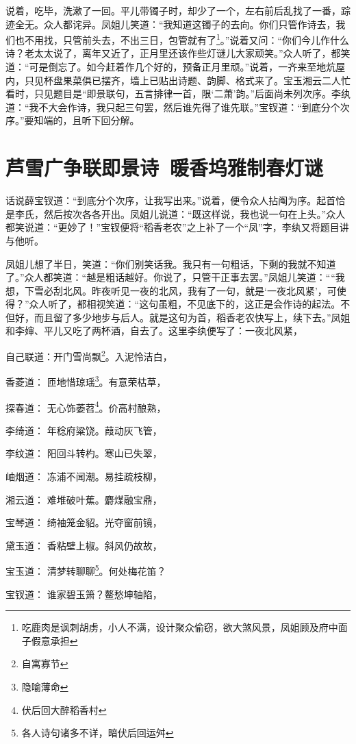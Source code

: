 \documentclass[12pt,oneside]{book}
\begin{document}
说着，吃毕，洗漱了一回。平儿带镯子时，却少了一个，左右前后乱找了一番，踪迹全无。众人都诧异。凤姐儿笑道：“我知道这镯子的去向。你们只管作诗去，我们也不用找，只管前头去，不出三日，包管就有了\footnote{吃鹿肉是讽刺胡虏，小人不满，设计聚众偷窃，欲大煞风景，凤姐顾及府中面子假意承担}。”说着又问：“你们今儿作什么诗？老太太说了，离年又近了，正月里还该作些灯谜儿大家顽笑。”众人听了，都笑道：“可是倒忘了。如今赶着作几个好的，预备正月里顽。”说着，一齐来至地炕屋内，只见杯盘果菜俱已摆齐，墙上已贴出诗题、韵脚、格式来了。宝玉湘云二人忙看时，只见题目是“即景联句，五言排律一首，限‘二萧’韵。”后面尚未列次序。李纨道：“我不大会作诗，我只起三句罢，然后谁先得了谁先联。”宝钗道：“到底分个次序。”要知端的，且听下回分解。


 
\chapter{芦雪广争联即景诗~暖香坞雅制春灯谜}
话说薛宝钗道：“到底分个次序，让我写出来。”说着，便令众人拈阄为序。起首恰是李氏，然后按次各各开出。凤姐儿说道：“既这样说，我也说一句在上头。”众人都笑说道：“更妙了！”宝钗便将“稻香老农”之上补了一个“凤”字，李纨又将题目讲与他听。

凤姐儿想了半日，笑道：“你们别笑话我。我只有一句粗话，下剩的我就不知道了。”众人都笑道：“越是粗话越好。你说了，只管干正事去罢。”凤姐儿笑道：““我想，下雪必刮北风。昨夜听见一夜的北风，我有了一句，就是‘一夜北风紧’，可使得？”众人听了，都相视笑道：“这句虽粗，不见底下的，这正是会作诗的起法。不但好，而且留了多少地步与后人。就是这句为首，稻香老农快写上，续下去。”凤姐和李婶、平儿又吃了两杯酒，自去了。这里李纨便写了：一夜北风紧，

自己联道：开门雪尚飘\footnote{自寓寡节}。入泥怜洁白，

香菱道：  匝地惜琼瑶\footnote{隐喻薄命}。有意荣枯草，

探春道：  无心饰萎苕\footnote{伏后回大醉稻香村}。价高村酿熟，

李绮道：  年稔府粱饶。葭动灰飞管，

李纹道：  阳回斗转杓。寒山已失翠，

岫烟道：  冻浦不闻潮。易挂疏枝柳，

湘云道：  难堆破叶蕉。麝煤融宝鼎，

宝琴道：  绮袖笼金貂。光夺窗前镜，

黛玉道：  香粘壁上椒。斜风仍故故，

宝玉道：  清梦转聊聊\footnote{各人诗句诸多不详，暗伏后回运舛}。何处梅花笛？

宝钗道：  谁家碧玉箫？鳌愁坤轴陷，
\end{document}
